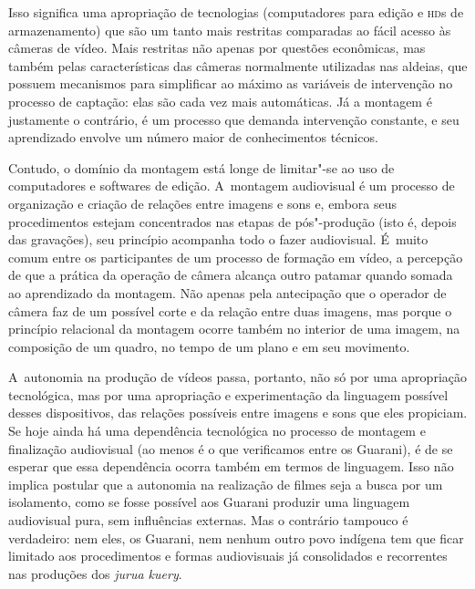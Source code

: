Isso significa uma apropriação de tecnologias (computadores para edição
e \textsc{hd}s de armazenamento) que são um tanto mais restritas
comparadas ao fácil acesso às câmeras de vídeo. Mais restritas não
apenas por questões econômicas, mas também pelas características das
câmeras normalmente utilizadas nas aldeias, que possuem mecanismos para
simplificar ao máximo as variáveis de intervenção no processo de
captação: elas são cada vez mais automáticas. Já a montagem é
justamente o contrário, é um processo que demanda intervenção
constante, e seu aprendizado envolve um número maior de conhecimentos
técnicos.

Contudo, o domínio da montagem está longe de limitar"-se ao uso de
computadores e softwares de edição. A~montagem audiovisual é um
processo de organização e criação de relações entre imagens e sons e,
embora seus procedimentos estejam concentrados nas etapas de
pós"-produção (isto é, depois das gravações), seu princípio acompanha
todo o fazer audiovisual. É~muito comum entre os participantes de um
processo de formação em vídeo, a percepção de que a prática da operação
de câmera alcança outro patamar quando somada ao aprendizado da
montagem. Não apenas pela antecipação que o operador de câmera faz de
um possível corte e da relação entre duas imagens, mas porque o
princípio relacional da montagem ocorre também no interior de uma
imagem, na composição de um quadro, no tempo de um plano e em seu
movimento.

A~autonomia na produção de vídeos passa, portanto, não só por uma
apropriação tecnológica, mas por uma apropriação e experimentação da
linguagem possível desses dispositivos, das relações possíveis entre
imagens e sons que eles propiciam. Se hoje ainda há uma dependência
tecnológica no processo de montagem e finalização audiovisual (ao menos
é o que verificamos entre os Guarani), é de se esperar que essa
dependência ocorra também em termos de linguagem. Isso não implica
postular que a autonomia na realização de filmes seja a busca por um
isolamento, como se fosse possível aos Guarani produzir uma linguagem
audiovisual pura, sem influências externas. Mas o contrário tampouco é
verdadeiro: nem eles, os Guarani, nem nenhum outro povo indígena tem
que ficar limitado aos procedimentos e formas audiovisuais já
consolidados e recorrentes nas produções dos \emph{jurua kuery}.

